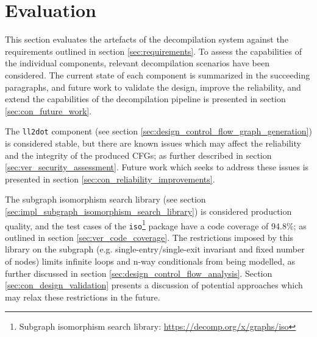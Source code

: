 
%

%
%

\section{Evaluation}
\label{sec:evaluation}

This section evaluates the artefacts of the decompilation system against the requirements outlined in section \ref{sec:requirements}. To assess the capabilities of the individual components, relevant decompilation scenarios have been considered. The current state of each component is summarized in the succeeding paragraphs, and future work to validate the design, improve the reliability, and extend the capabilities of the decompilation pipeline is presented in section \ref{sec:con_future_work}.

The \texttt{ll2dot} component (see section \ref{sec:design_control_flow_graph_generation}) is considered stable, but there are known issues which may affect the reliability and the integrity of the produced CFGs; as further described in section \ref{sec:ver_security_assessment}. Future work which seeks to address these issues is presented in section \ref{sec:con_reliability_improvements}.

The subgraph isomorphism search library (see section \ref{sec:impl_subgraph_isomorphism_search_library}) is considered production quality, and the test cases of the \texttt{iso}\footnote{Subgraph isomorphism search library: \url{https://decomp.org/x/graphs/iso}} package have a code coverage of 94.8\%; as outlined in section \ref{sec:ver_code_coverage}. The restrictions imposed by this library on the subgraph (e.g. single-entry/single-exit invariant and fixed number of nodes) limits infinite loops and n-way conditionals from being modelled, as further discussed in section \ref{sec:design_control_flow_analysis}. Section \ref{sec:con_design_validation} presents a discussion of potential approaches which may relax these restrictions in the future.

